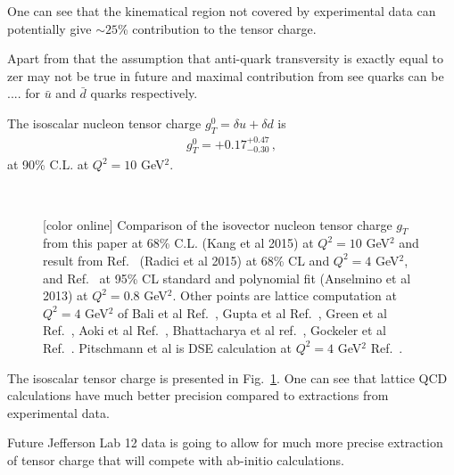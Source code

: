 \documentclass[twocolumn,showpacs,preprintnumbers,amsmath,amssymb,floatfix,prd]{revtex4}
\newcommand*{\FigPath}{.}%
\begin{document}
One can see that the kinematical region not covered by experimental data can potentially give $\sim 25$\% contribution to the tensor charge.

Apart from that the assumption that anti-quark transversity is exactly equal to zer may not be true in future and maximal contribution from see quarks can be ....
for $\bar u$ and $\bar d$ quarks respectively.


The isoscalar nucleon tensor charge $g_T^0= \delta u + \delta d$ is
\begin{eqnarray}
g_T^0 = +0.17^{+0.47}_{-0.30} \, ,
\end{eqnarray}
at 90\% C.L. at  $Q^2=10$ GeV$^2$.



\begin{figure}[tbp]
\centering
 \\
\caption{[color online] Comparison of the isovector nucleon tensor charge $g_T$   from this paper at 68\% C.L. (Kang et al 2015) at $Q^2=10$ GeV$^2$ and result from Ref.~\cite{Radici:2015mwa}  (Radici et al 2015) at 68\% CL and  $Q^2=4$ GeV$^2$,
and Ref.~\cite{Anselmino:2013vqa} at 95\% CL standard and polynomial fit (Anselmino et al 2013) at $Q^2=0.8$ GeV$^2$. Other points are lattice computation  at $Q^2=4$ GeV$^2$ of Bali et al Ref.~\cite{Bali:2014nma},  Gupta et al Ref.~\cite{Gupta:2015tpa}, Green et al Ref.~\cite{Green:2012ej}, Aoki et al Ref.~\cite{Aoki:2010xg}, Bhattacharya et al  ref.~\cite{Bhattacharya:2013ehc}, Gockeler et al Ref.~\cite{Gockeler:2005cj}. Pitschmann et al is DSE calculation at $Q^2=4$ GeV$^2$  Ref.~\cite{Pitschmann:2014jxa}.}
\label{fig:comparison_gt}
\end{figure}
  
The isoscalar tensor charge is presented in Fig.~\ref{fig:comparison_gt}. 
One can see that lattice QCD calculations have much better precision compared to extractions from experimental data.

Future Jefferson Lab 12 data is going to allow for much more precise extraction of tensor charge that will compete with ab-initio calculations.


\end{document}
